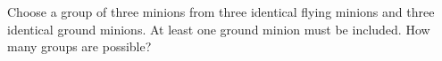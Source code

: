 Choose a group of three minions from three identical flying minions and three identical ground minions. At least one ground minion must be included. How many groups are possible?
